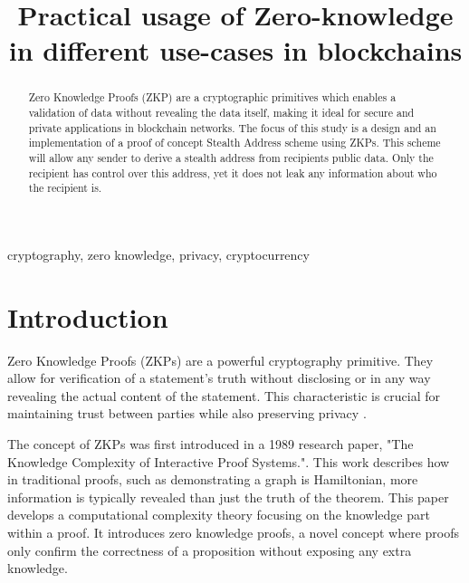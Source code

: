 \documentclass[conference,comsoc,10pt]{IEEEtran}
\begin{document}
\hypersetup{
    colorlinks=true,
    linkcolor=blue,
    urlcolor=cyan,
}

\newcommand{\DOUBLEBLIND}{}   

\title{Practical usage of Zero-knowledge in different use-cases in blockchains} 

\author{
}

\maketitle

\begin{abstract}
    Zero Knowledge Proofs (ZKP) are a cryptographic primitives which enables a
    validation of data without revealing the data itself, making it ideal for
    secure and private applications in blockchain networks. The focus of this
    study is a design and an implementation of a proof of concept Stealth
    Address scheme using ZKPs. This scheme will allow any sender to derive a
    stealth address from recipients public data. Only the recipient has control
    over this address, yet it does not leak any information about who the
    recipient is.
\end{abstract}

\begin{IEEEkeywords}
    cryptography, zero knowledge, privacy, cryptocurrency
\end{IEEEkeywords}

\section{Introduction}
    Zero Knowledge Proofs (ZKPs) are a powerful cryptography primitive. They allow
    for verification of a statement's truth without disclosing or in any way revealing
    the actual content of the statement. This characteristic is crucial for
    maintaining trust between parties while also preserving privacy \cite{goldreich1991proofs}.

    The concept of ZKPs was first introduced in a 1989 research paper, "The
    Knowledge Complexity of Interactive Proof Systems."\cite{Goldwasser1989}.
    This work describes how in traditional proofs, such as demonstrating a graph
    is Hamiltonian, more information is typically revealed than just the truth of
    the theorem. This paper develops a computational complexity theory focusing
    on the knowledge part within a proof. It introduces zero knowledge proofs,
    a novel concept where proofs only confirm the correctness of a proposition
    without exposing any extra knowledge.
\end{document}
